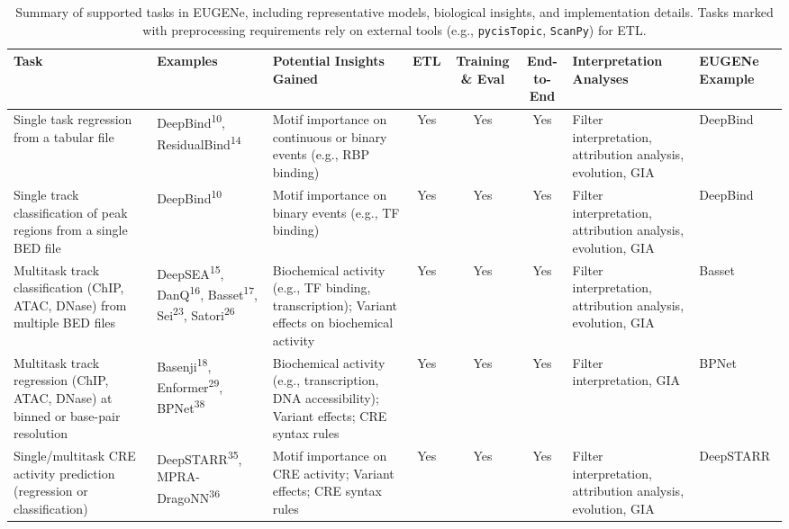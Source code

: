 \begin{landscape}
\begin{table}[ht]
\centering
\caption[Summary of supported tasks in EUGENe]{Summary of supported tasks in EUGENe, including representative models, biological insights, and implementation details. Tasks marked with preprocessing requirements rely on external tools (e.g., \texttt{pycisTopic}, \texttt{ScanPy}) for ETL.}
\label{tab:1 supplementary_1}

\renewcommand{\arraystretch}{0.2} %
\begin{tabularx}{\linewidth}{|l|l|X|c|c|c|X|l|}
\hline
\textbf{Task} & \textbf{Examples} & \textbf{Potential Insights Gained} & \textbf{ETL} & \textbf{Training \& Eval} & \textbf{End-to-End} & \textbf{Interpretation Analyses} & \textbf{EUGENe Example} \\
\hline
Single task regression from a tabular file & DeepBind\textsuperscript{10}, ResidualBind\textsuperscript{14} & Motif importance on continuous or binary events (e.g., RBP binding) & Yes & Yes & Yes & Filter interpretation, attribution analysis, evolution, GIA & DeepBind \\
\hline
Single track classification of peak regions from a single BED file & DeepBind\textsuperscript{10} & Motif importance on binary events (e.g., TF binding) & Yes & Yes & Yes & Filter interpretation, attribution analysis, evolution, GIA & DeepBind \\
\hline
Multitask track classification (ChIP, ATAC, DNase) from multiple BED files & DeepSEA\textsuperscript{15}, DanQ\textsuperscript{16}, Basset\textsuperscript{17}, Sei\textsuperscript{23}, Satori\textsuperscript{26} & Biochemical activity (e.g., TF binding, transcription); Variant effects on biochemical activity & Yes & Yes & Yes & Filter interpretation, attribution analysis, evolution, GIA & Basset \\
\hline
Multitask track regression (ChIP, ATAC, DNase) at binned or base-pair resolution & Basenji\textsuperscript{18}, Enformer\textsuperscript{29}, BPNet\textsuperscript{38} & Biochemical activity (e.g., transcription, DNA accessibility); Variant effects; CRE syntax rules & Yes & Yes & Yes & Filter interpretation, GIA & BPNet \\
\hline
Single/multitask CRE activity prediction (regression or classification) & DeepSTARR\textsuperscript{35}, MPRA-DragoNN\textsuperscript{36} & Motif importance on CRE activity; Variant effects; CRE syntax rules & Yes & Yes & Yes & Filter interpretation, attribution analysis, evolution, GIA & DeepSTARR \\

\end{tabularx}
\end{table}
\end{landscape}

